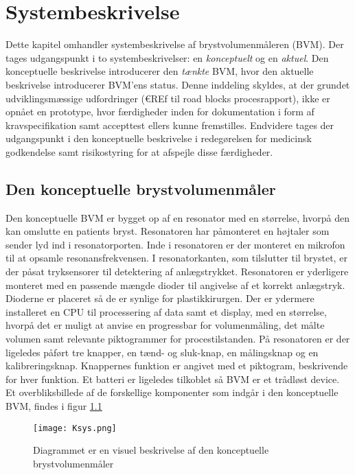 \chapter{Systembeskrivelse}
Dette kapitel omhandler systembeskrivelse af brystvolumenmåleren (BVM). Der tages udgangspunkt i to systembeskrivelser: en \textit{konceptuelt} og en \textit{aktuel}. Den konceptuelle beskrivelse introducerer den \textit{tænkte} BVM, hvor den aktuelle beskrivelse introducerer BVM'ens status. Denne inddeling skyldes, at der grundet udviklingsmæssige udfordringer (€REf til road blocks procesrapport), ikke er opnået en prototype, hvor færdigheder inden for dokumentation i form af kravspecifikation samt accepttest ellers kunne fremstilles. Endvidere tages der udgangspunkt i den konceptuelle beskrivelse i redegørelsen for medicinsk godkendelse samt risikostyring for at afspejle disse færdigheder.   

\section{Den konceptuelle brystvolumenmåler} \label{sec:BVMopb}
	
	Den konceptuelle BVM er bygget op af en resonator med en størrelse, hvorpå den kan omslutte en patients bryst. Resonatoren har påmonteret en højtaler som sender lyd ind i resonatorporten. Inde i resonatoren er der monteret en mikrofon til at opsamle resonansfrekvensen. I resonatorkanten, som tilslutter til brystet, er der påsat tryksensorer til detektering af anlægstrykket. Resonatoren er yderligere monteret med en passende mængde dioder til angivelse af et korrekt anlægstryk. Dioderne er placeret så de er synlige for plastikkirurgen. Der er ydermere installeret en CPU til processering af data samt et display, med en størrelse, hvorpå det er muligt at anvise en progressbar for volumenmåling, det målte volumen samt relevante piktogrammer for procestilstanden. På resonatoren er der ligeledes påført tre knapper, en tænd- og sluk-knap, en målingsknap og en kalibreringsknap. Knappernes funktion er angivet med et piktogram, beskrivende for hver funktion. Et batteri er ligeledes tilkoblet så BVM er et trådløst device. Et overbliksbillede af de forskellige komponenter som indgår i den konceptuelle BVM, findes i figur \ref{fig:ksys} 
		
\vspace{5mm}  
		
		\begin{figure}[htb]
			\centering
				\texttt{[image: Ksys.png]}
				\caption{Diagrammet er en visuel beskrivelse af den konceptuelle brystvolumenmåler}	
				\label{fig:ksys}
			\end{figure}	     
		
